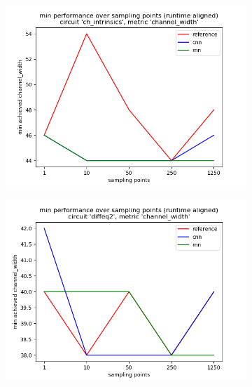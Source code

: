 \begin{figure}[H]
	\centering
	\begin{subfigure}[b]{0.49\linewidth}
		\includegraphics[width=\linewidth]{plots/eval-ch_intrinsics-chan-width-min-full.png}
	\end{subfigure}
	\begin{subfigure}[b]{0.49\linewidth}
		\includegraphics[width=\linewidth]{plots/eval-diffeq2-chan-width-min-full.png}
	\end{subfigure}
	\begin{subfigure}[b]{0.49\linewidth}

\end{subfigure}
\end{figure}

